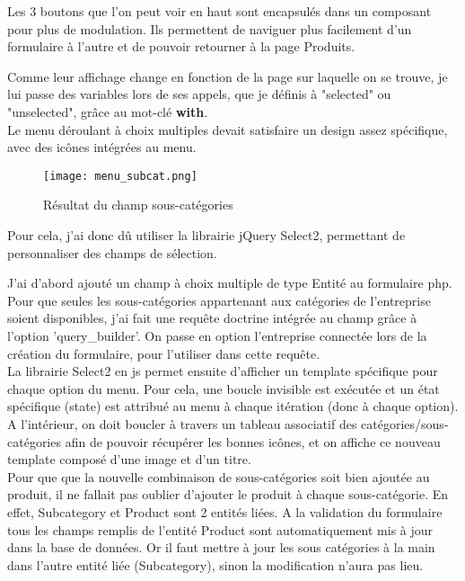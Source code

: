 Les 3 boutons que l'on peut voir en haut sont encapsulés dans un composant pour plus de modulation.
Ils permettent de naviguer plus facilement d'un formulaire à l'autre et de pouvoir retourner à la page Produits.

Comme leur affichage change en fonction de la page sur laquelle on se trouve, je lui passe des variables lors de ses appels, que je définis à "selected" ou "unselected", grâce au mot-clé \textbf{with}.\\

Le menu déroulant à choix multiples devait satisfaire un design assez spécifique, avec des icônes intégrées au menu.

\begin{figure}[H]
    \texttt{[image: menu\_subcat.png]}
    \caption{Résultat du champ sous-catégories}
\end{figure}

Pour cela, j'ai donc dû utiliser la librairie jQuery Select2, permettant de personnaliser des champs de sélection.

J'ai d'abord ajouté un champ à choix multiple de type Entité au formulaire php. 
Pour que seules les sous-catégories appartenant aux catégories de l'entreprise soient disponibles, j'ai fait une requête doctrine intégrée au champ grâce à l'option 'query\_builder'. 
On passe en option l'entreprise connectée lors de la création du formulaire, pour l'utiliser dans cette requête.\\


La librairie Select2 en js permet ensuite d'afficher un template spécifique pour chaque option du menu.
Pour cela, une boucle invisible est exécutée et un état spécifique (state) est attribué au menu à chaque itération (donc à chaque option).
A l'intérieur, on doit boucler à travers un tableau associatif des catégories/sous-catégories afin de pouvoir récupérer les bonnes icônes, et on affiche ce nouveau template composé d'une image et d'un titre.\\

Pour que que la nouvelle combinaison de sous-catégories soit bien ajoutée au produit, il ne fallait pas oublier d'ajouter le produit à chaque sous-catégorie.
En effet, Subcategory et Product sont 2 entités liées. A la validation du formulaire tous les champs remplis de l'entité Product sont automatiquement mis à jour dans la base de données.
Or il faut mettre à jour les sous catégories à la main dans l'autre entité liée (Subcategory), sinon la modification n'aura pas lieu.

